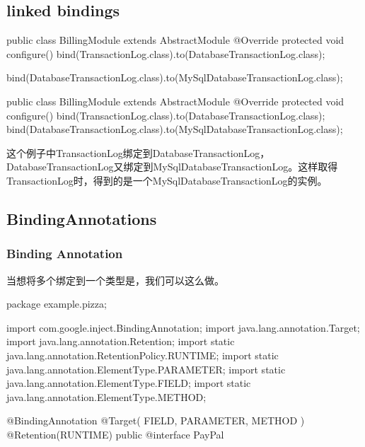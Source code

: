 \subsection{linked bindings}

\begin{Java}[map一个接口到他的实现]
public class BillingModule extends AbstractModule {
  @Override 
  protected void configure() {
    bind(TransactionLog.class).to(DatabaseTransactionLog.class);
  }
}
\end{Java}


\begin{Java}[可以link一个类型的实例或者他的子类型]
bind(DatabaseTransactionLog.class).to(MySqlDatabaseTransactionLog.class);
\end{Java}


\begin{Java}[link可以chain]
public class BillingModule extends AbstractModule {
  @Override 
  protected void configure() {
    bind(TransactionLog.class).to(DatabaseTransactionLog.class);
    bind(DatabaseTransactionLog.class).to(MySqlDatabaseTransactionLog.class);
  }
}
\end{Java}
这个例子中TransactionLog绑定到DatabaseTransactionLog， DatabaseTransactionLog又绑定到MySqlDatabaseTransactionLog。这样取得TransactionLog时，得到的是一个MySqlDatabaseTransactionLog的实例。


\subsection{BindingAnnotations}

\subsubsection{Binding Annotation}
当想将多个绑定到一个类型是，我们可以这么做。

\begin{Java}[声明一个annotation]
package example.pizza;

import com.google.inject.BindingAnnotation;
import java.lang.annotation.Target;
import java.lang.annotation.Retention;
import static java.lang.annotation.RetentionPolicy.RUNTIME;
import static java.lang.annotation.ElementType.PARAMETER;
import static java.lang.annotation.ElementType.FIELD;
import static java.lang.annotation.ElementType.METHOD;

@BindingAnnotation @Target({ FIELD, PARAMETER, METHOD }) @Retention(RUNTIME)
public @interface PayPal {}
\end{Java}

